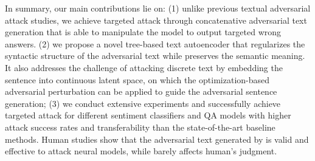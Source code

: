 In summary, our main contributions lie on:
(1) unlike previous textual adversarial attack studies, we achieve targeted attack through concatenative adversarial text generation that is able to manipulate the model to output targeted wrong answers. 
(2) we propose a novel tree-based text autoencoder that regularizes the syntactic structure of the adversarial text while preserves the semantic meaning. It also addresses the challenge of attacking discrete text by embedding the sentence into continuous latent space, on which the optimization-based adversarial perturbation can be applied to guide the adversarial sentence generation; 
(3) we conduct extensive experiments and successfully achieve targeted attack for different sentiment classifiers and QA models with higher attack success rates and transferability than the state-of-the-art baseline methods. Human studies show that the adversarial text generated by \advcodec is valid and effective to attack neural models, while barely affects human's judgment. 
